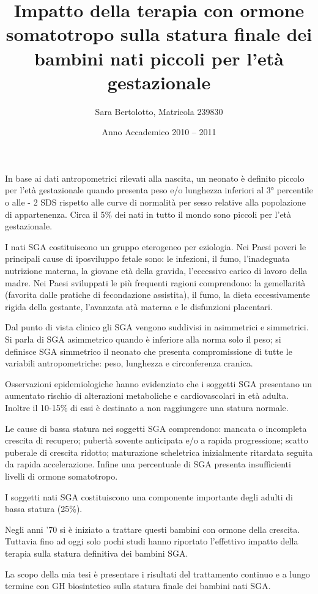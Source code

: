 \documentclass[12pt,a4paper]{article}
\author{Sara Bertolotto, Matricola 239830}
\title{Impatto della terapia con ormone somatotropo sulla statura finale dei bambini nati piccoli per l'età gestazionale}
\date{Anno Accademico 2010 -- 2011}
\begin{document}
\maketitle
In base ai dati antropometrici rilevati alla nascita, un neonato è definito piccolo per l'età gestazionale quando presenta peso e/o lunghezza inferiori al 3° percentile o alle - 2 SDS rispetto alle curve di normalità per sesso relative alla popolazione di appartenenza. Circa il 5\% dei nati in tutto il mondo sono piccoli per l'età gestazionale. 

I nati SGA costituiscono un gruppo eterogeneo per eziologia. Nei Paesi poveri le principali cause di iposviluppo fetale sono: le infezioni, il fumo, l'inadeguata nutrizione materna, la giovane età della gravida, l'eccessivo carico di lavoro della madre. Nei Paesi sviluppati le più frequenti ragioni comprendono: la gemellarità (favorita dalle pratiche di fecondazione assistita), il fumo, la dieta eccessivamente rigida della gestante, l'avanzata atà materna e le disfunzioni placentari.

Dal punto di vista clinico gli SGA vengono suddivisi in asimmetrici e simmetrici. Si parla di SGA asimmetrico quando è inferiore alla norma solo il peso; si definisce SGA simmetrico il neonato che presenta compromissione di tutte le variabili antropometriche: peso, lunghezza e circonferenza cranica.

Osservazioni epidemiologiche hanno evidenziato che i soggetti SGA presentano un aumentato rischio di alterazioni metaboliche e cardiovascolari in età adulta. Inoltre il 10-15\% di essi è destinato a non raggiungere una statura normale.

Le cause di bassa statura nei soggetti SGA comprendono: mancata o incompleta crescita di recupero; pubertà sovente anticipata e/o a rapida progressione; scatto puberale di crescita ridotto; maturazione scheletrica inizialmente ritardata seguita da rapida accelerazione. Infine una percentuale di SGA presenta insufficienti livelli di ormone somatotropo.

I soggetti nati SGA costituiscono una componente importante degli adulti di bassa statura (25\%).

Negli anni '70 si è iniziato a trattare questi bambini con ormone della crescita. Tuttavia fino ad oggi solo pochi studi hanno riportato l'effettivo impatto della terapia sulla statura definitiva dei bambini SGA.

La scopo della mia tesi è presentare i risultati del trattamento continuo e a lungo termine con GH  biosintetico sulla statura finale dei bambini nati SGA.
\end{document}
